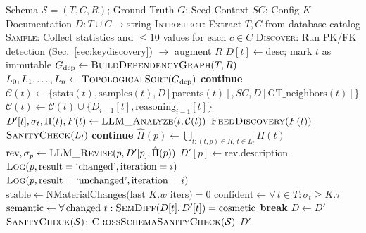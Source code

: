 \documentclass[sigconf, nonacm]{acmart}
\begin{document}
\begin{algorithm}[htbp]
\caption{Iterative Schema Documentation with Context Propagation}
\label{alg:main}
\begin{algorithmic}[1]
\Require Schema $\mathcal{S} = (T, C, R)$; Ground Truth $G$; Seed Context $SC$; Config $K$
\Ensure Documentation $D : T \cup C \to \text{string}$
\State \textsc{Introspect}: Extract $T, C$ from database catalog
\State \textsc{Sample}: Collect statistics and $\leq 10$ values for each $c \in C$
\State \textsc{Discover}: Run PK/FK detection (Sec.~\ref{sec:keydiscovery}) $\to$ augment $R$
    \State $D[t] \gets \text{desc}$; mark $t$ as immutable
\EndFor
\State $G_{\text{dep}} \gets \textsc{BuildDependencyGraph}(T, R)$
\State $L_0, L_1, \ldots, L_n \gets \textsc{TopologicalSort}(G_{\text{dep}})$
     
             \textbf{continue} \EndIf
            \State $\mathcal{C}(t) \gets \{\text{stats}(t), \text{samples}(t), D[\text{parents}(t)], SC, D[\text{GT\_neighbors}(t)]\}$
             $\mathcal{C}(t) \gets \mathcal{C}(t) \cup \{D_{i-1}[t], \text{reasoning}_{i-1}[t]\}$ \EndIf
            \State $D'[t], \sigma_t, \Pi(t), F(t) \gets \textsc{LLM\_Analyze}(t, \mathcal{C}(t))$
            \State $\textsc{FeedDiscovery}(F(t))$
        \EndFor
        \State $\textsc{SanityCheck}(L_l)$
         
             \textbf{continue} \EndIf
            \State $\hat{\Pi}(p) \gets \bigcup_{t:(t,p) \in R,\, t \in L_l} \Pi(t)$
                \State $\text{rev}, \sigma_p \gets \textsc{LLM\_Revise}(p, D'[p], \hat{\Pi}(p))$
                    \State $D'[p] \gets \text{rev.description}$
                    \State $\textsc{Log}(p, \text{result}=\text{`changed'}, \text{iteration}=i)$
                \Else
                    \State $\textsc{Log}(p, \text{result}=\text{`unchanged'}, \text{iteration}=i)$
                \EndIf
            \EndIf
        \EndFor
    \EndFor
    \State $\text{stable} \gets \text{NMaterialChanges(last } K.w \text{ iters}) = 0$
    \State $\text{confident} \gets \forall\, t \in T : \sigma_t \geq K.\tau$
    \State $\text{semantic} \gets \forall\, \text{changed } t : \textsc{SemDiff}(D[t], D'[t]) = \text{cosmetic}$
        \State \textbf{break}
    \EndIf
    \State $D \gets D'$
\EndFor
\State $\textsc{SanityCheck}(\mathcal{S})$; $\textsc{CrossSchemaSanityCheck}(\mathcal{S})$
\State \Return $D'$
\end{algorithmic}
\end{algorithm}
\end{document}
